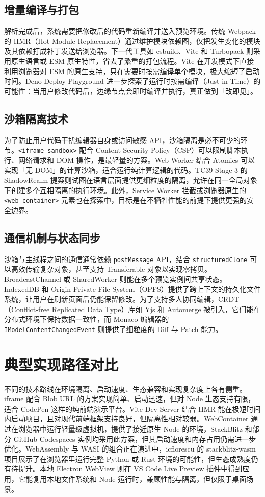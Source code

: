 \section{增量编译与打包}
解析完成后，系统需要把修改后的代码重新编译并送入预览环境。传统 Webpack 的 HMR（Hot Module Replacement）通过维护模块依赖图，仅把发生变化的模块及其依赖打成补丁发送给浏览器。下一代工具如 esbuild、Vite 和 Turbopack 则采用原生语言或 ESM 原生特性，省去了繁重的打包流程。Vite 在开发模式下直接利用浏览器对 ESM 的原生支持，只在需要时按需编译单个模块，极大缩短了启动时间。Deno Deploy Playground 进一步探索了运行时按需编译（Just-in-Time）的可能性：当用户修改代码后，边缘节点会即时编译并执行，真正做到「改即见」。\par
\section{沙箱隔离技术}
为了防止用户代码干扰编辑器自身或访问敏感 API，沙箱隔离是必不可少的环节。\texttt{<iframe sandbox>} 配合 Content-Security-Policy（CSP）可以限制脚本执行、网络请求和 DOM 操作，是最轻量的方案。Web Worker 结合 Atomics 可以实现「无 DOM」的计算沙箱，适合运行纯计算逻辑的代码。TC39 Stage 3 的 ShadowRealm 提案则试图在语言层面提供更细粒度的隔离，允许在同一全局对象下创建多个互相隔离的执行环境。此外，Service Worker 拦截或浏览器原生的 \texttt{<web-container>} 元素也在探索中，目标是在不牺牲性能的前提下提供更强的安全边界。\par
\section{通信机制与状态同步}
沙箱与主线程之间的通信通常依赖 \texttt{postMessage} API，结合 \texttt{structuredClone} 可以高效传输复杂对象，甚至支持 Transferable 对象以实现零拷贝。BroadcastChannel 或 SharedWorker 则能在多个预览实例间共享状态。IndexedDB 和 Origin Private File System（OPFS）提供了跨上下文的持久化文件系统，让用户在刷新页面后仍能保留修改。为了支持多人协同编辑，CRDT（Conflict-free Replicated Data Type）库如 Yjs 和 Automerge 被引入，它们能在分布式环境下保持数据一致性，而 Monaco 编辑器的 \texttt{IModelContentChangedEvent} 则提供了细粒度的 Diff 与 Patch 能力。\par
\chapter{典型实现路径对比}
不同的技术路线在环境隔离、启动速度、生态兼容和实现复杂度上各有侧重。iframe 配合 Blob URL 的方案实现简单、启动迅速，但对 Node 生态支持有限，适合 CodePen 这样的纯前端演示平台。Vite Dev Server 结合 HMR 能在极短时间内启动项目，且对现代前端框架支持良好，但隔离性相对较弱。WebContainer 通过在浏览器中运行轻量级虚拟机，提供了接近原生 Node 的环境，StackBlitz 和部分 GitHub Codespaces 实例均采用此方案，但其启动速度和内存占用仍需进一步优化。WebAssembly 与 WASI 的组合正在演进中，icflorescu 的 stackblitz-wasm 项目展示了在浏览器里运行完整 Python 或 Rust 环境的可能性，但生态成熟度仍有待提升。本地 Electron WebView 则在 VS Code Live Preview 插件中得到应用，它能复用本地文件系统和 Node 运行时，兼顾性能与隔离，但仅限于桌面场景。\par
